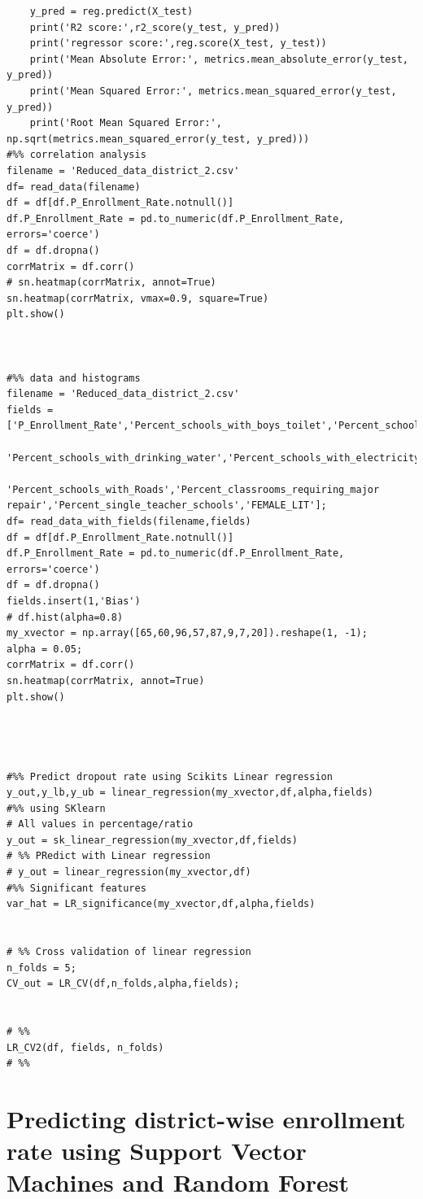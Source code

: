 \documentclass{article}
\begin{document}
\begin{appendices}
\begin{lstlisting}
    y_pred = reg.predict(X_test)
    print('R2 score:',r2_score(y_test, y_pred))
    print('regressor score:',reg.score(X_test, y_test))
    print('Mean Absolute Error:', metrics.mean_absolute_error(y_test, y_pred))
    print('Mean Squared Error:', metrics.mean_squared_error(y_test, y_pred))
    print('Root Mean Squared Error:', np.sqrt(metrics.mean_squared_error(y_test, y_pred))) 
#%% correlation analysis
filename = 'Reduced_data_district_2.csv'
df= read_data(filename)
df = df[df.P_Enrollment_Rate.notnull()]
df.P_Enrollment_Rate = pd.to_numeric(df.P_Enrollment_Rate, errors='coerce')
df = df.dropna()
corrMatrix = df.corr()
# sn.heatmap(corrMatrix, annot=True)
sn.heatmap(corrMatrix, vmax=0.9, square=True)
plt.show()



#%% data and histograms
filename = 'Reduced_data_district_2.csv'
fields =['P_Enrollment_Rate','Percent_schools_with_boys_toilet','Percent_schools_with_playground',\
        'Percent_schools_with_drinking_water','Percent_schools_with_electricity',\
            'Percent_schools_with_Roads','Percent_classrooms_requiring_major repair','Percent_single_teacher_schools','FEMALE_LIT'];
df= read_data_with_fields(filename,fields)
df = df[df.P_Enrollment_Rate.notnull()]
df.P_Enrollment_Rate = pd.to_numeric(df.P_Enrollment_Rate, errors='coerce')
df = df.dropna()
fields.insert(1,'Bias')
# df.hist(alpha=0.8)
my_xvector = np.array([65,60,96,57,87,9,7,20]).reshape(1, -1);
alpha = 0.05;
corrMatrix = df.corr()
sn.heatmap(corrMatrix, annot=True)
plt.show()




#%% Predict dropout rate using Scikits Linear regression
y_out,y_lb,y_ub = linear_regression(my_xvector,df,alpha,fields)
#%% using SKlearn
# All values in percentage/ratio
y_out = sk_linear_regression(my_xvector,df,fields)
# %% PRedict with Linear regression
# y_out = linear_regression(my_xvector,df)
#%% Significant features
var_hat = LR_significance(my_xvector,df,alpha,fields)


# %% Cross validation of linear regression
n_folds = 5;
CV_out = LR_CV(df,n_folds,alpha,fields);


# %%
LR_CV2(df, fields, n_folds)
# %%

\end{lstlisting}


\pagebreak
\section{Predicting district-wise enrollment rate using Support Vector Machines and Random Forest}
\begin{lstlisting}


\end{lstlisting}
\end{appendices}
\end{document}

